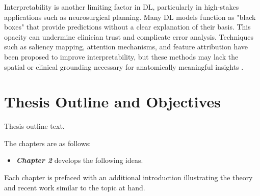 Interpretability is another limiting factor in DL, particularly in high-stakes applications such as neurosurgical planning. Many DL models function as "black boxes" that provide predictions without a clear explanation of their basis. This opacity can undermine clinician trust and complicate error analysis. Techniques such as saliency mapping, attention mechanisms, and feature attribution have been proposed to improve interpretability, but these methods may lack the spatial or clinical grounding necessary for anatomically meaningful insights \cite{holzinger2019causability}.

\section{Thesis Outline and Objectives}
Thesis outline text.

The chapters are as follows:
\begin{itemize}
\item \textit{\textbf{Chapter 2}} develops the following ideas.
\end{itemize}
Each chapter is prefaced with an additional introduction illustrating the theory and recent work similar to the topic at hand.